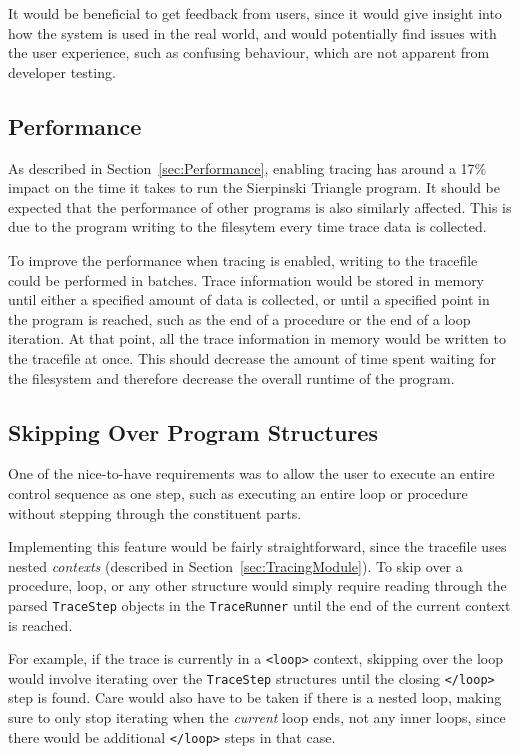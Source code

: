 \documentclass[authoryearcitations]{UoYCSproject}
\begin{document}
It would be beneficial to get feedback from users, since it would give insight into
how the system is used in the real world, and would potentially find issues with the
user experience, such as confusing behaviour, which are not apparent from developer
testing.

\subsection{Performance}
\label{sec:FWPerformance}

As described in Section~\ref{sec:Performance}, enabling tracing has around a 17\%
impact on the time it takes to run the Sierpinski Triangle program. It should be
expected that the performance of other programs is also similarly affected. This
is due to the program writing to the filesytem every time trace data is collected.

To improve the performance when tracing is enabled, writing to the tracefile
could be performed in batches. Trace information would be stored in memory until
either a specified amount of data is collected, or until a specified point in 
the program is reached, such as the end of a procedure or the end of a loop
iteration. At that point, all the trace information in memory would be written
to the tracefile at once. This should decrease the amount of time spent waiting
for the filesystem and therefore decrease the overall runtime of the program.

\subsection{Skipping Over Program Structures}
\label{sec:SkippingOverProgramStructures}

One of the nice-to-have requirements was to allow the user to execute an entire
control sequence as one step, such as executing an entire loop or procedure
without stepping through the constituent parts.

Implementing this feature would be fairly straightforward, since the tracefile
uses nested \emph{contexts} (described in Section~\ref{sec:TracingModule}).
To skip over a procedure, loop, or any other structure would simply require
reading through the parsed \texttt{TraceStep} objects in the \texttt{TraceRunner}
until the end of the current context is reached.

For example, if the trace is currently in a \texttt{<loop>} context, skipping
over the loop would involve iterating over the \texttt{TraceStep} structures
until the closing \texttt{</loop>} step is found. Care would also have to be
taken if there is a nested loop, making sure to only stop iterating when the
\emph{current} loop ends, not any inner loops, since there would be additional
\texttt{</loop>} steps in that case.
\end{document}
